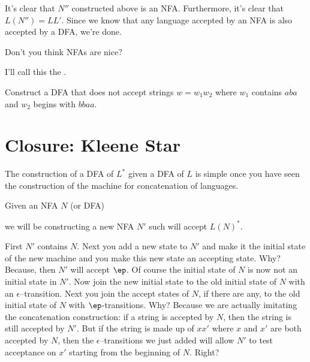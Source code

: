 It's clear that $N''$ constructed above is an NFA.
Furthermore, it's clear that $L(N'') = LL'$.
Since we know that any language accepted by an NFA is also accepted by a DFA,
we're done.

Don't you think NFAs are nice?

I'll call this the .


\newpage
\begin{ex}
Construct a DFA that does not accept strings $w = w_1 w_2$
where $w_1$ contains $aba$ and $w_2$ begins with $bbaa$.
\end{ex}



\newpage
\section{Closure: Kleene Star}

The construction of a DFA of $L^*$ given a DFA of $L$
is simple once you have seen the
construction of the machine for concatenation of languages.

Given an NFA $N$ (or DFA)

\begin{center}
\end{center}

we will be constructing a new NFA $N'$ such will accept $L(N)^*$.

First $N'$ contains $N$.
Next you add a new state to $N'$ and make it the initial state of
the new machine and you make this new state an accepting state.
Why?
Because, then $N'$ will accept $\ep$.
Of course the initial state of $N$ is now not an initial state in $N'$.
Now join the new initial state to the old initial state of $N$ with an $\epsilon$--transition.
Next you join the accept states of $N$, if there are any, to the 
old initial state of $N$ with
$\ep$-transitions.
Why? Because we are actually imitating the concatenation construction: if a string is accepted by $N$, then
the string is still accepted by $N'$. But if the string is made up of $xx'$ where $x$ and $x'$ are both
accepted by $N$, then the $\epsilon$--transitions we just added will allow $N'$ to test acceptance on $x'$ starting
from the beginning of $N$. Right?

